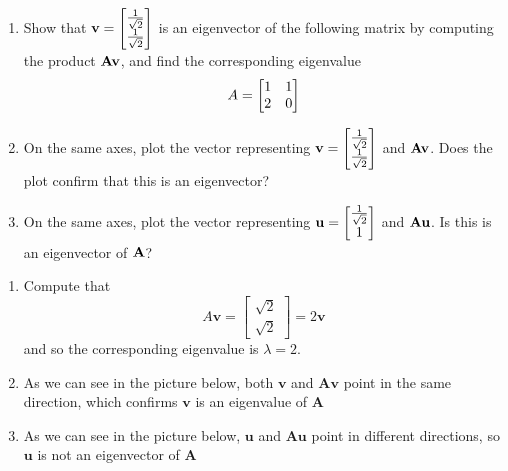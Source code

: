 \begin{prob}
\begin{enumerate}
\item Show that $\mathbf{v} = \begin{bmatrix} \frac{1}{\sqrt 2} \\ \frac{1}{\sqrt 2} \end{bmatrix}$ is an eigenvector of the following matrix by computing the product $\mathbf{A} \mathbf{v}$, and find the corresponding eigenvalue
\begin{align}
A = \begin{bmatrix} 1 & 1 \\ 2 & 0\end{bmatrix}
\end{align}
\item On the same axes, plot the vector representing $\mathbf{v}=\begin{bmatrix} \frac{1}{\sqrt 2} \\ \frac{1}{\sqrt 2} \end{bmatrix}$ and $\mathbf{A}\mathbf{v}$. Does the plot confirm that this is an eigenvector?
\item On the same axes, plot the vector representing $\mathbf{u} = \begin{bmatrix} \frac{1}{\sqrt 2} \\ 1 \end{bmatrix}$ and $\mathbf{A}\mathbf{u}$. Is this is an eigenvector of $\mathbf{A}$?
\end{enumerate}
\end{prob}
\begin{sol}
\begin{enumerate}
    \item Compute that
    $$A \mathbf{v} = \begin{bmatrix} \sqrt{2} \\ \sqrt{2} \end{bmatrix} = 2\mathbf{v}$$
    and so the corresponding eigenvalue is $\lambda=2$.
    \item As we can see in the picture below, both $\mathbf{v}$ and $\mathbf{Av}$ point in the same direction, which confirms $\mathbf{v}$ is an eigenvalue of $\mathbf{A}$
    \begin{center}
    \end{center}
    
    \item As we can see in the picture below, $\mathbf{u}$ and $\mathbf{Au}$ point in different directions, so $\mathbf{u}$ is not an eigenvector of $\mathbf{A}$
    \begin{center}
    \end{center}
\end{enumerate}
\end{sol}

